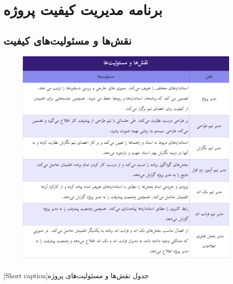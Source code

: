 \section{
برنامه مدیریت کیفیت پروژه
}

\subsection{
نقش‌ها و مسئولیت‌های کیفیت
}
\begin{center}
  \begin{figure} [h!]
    { \includegraphics[width=\textwidth , scale=1.5]{appandecies/quality_acceptance_criteria_1.pdf}}
  \end{figure}
  [Short caption]{جدول نقش‌ها و مسئولیت‌های پروژه}
\end{center}

